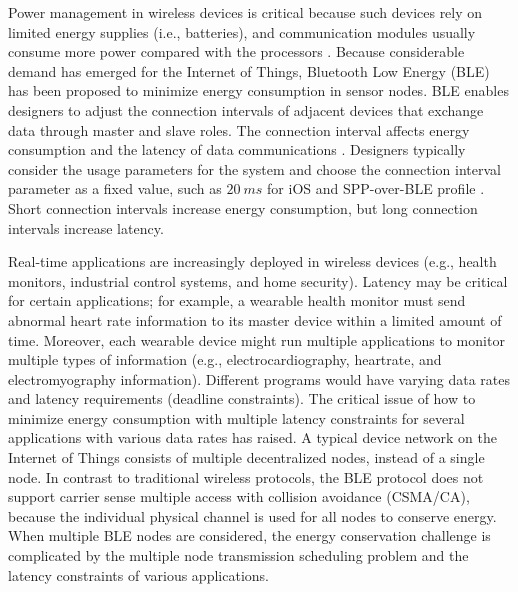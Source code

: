 \documentclass[10pt,journal,compsoc]{IEEEtran}
\begin{document}
Power management in wireless devices is critical because such devices rely on limited energy supplies (i.e., batteries), and communication modules usually consume more power compared with the processors \cite{phuong2015real}. Because considerable demand has emerged for the Internet of Things, Bluetooth Low Energy (BLE) has been proposed to minimize energy consumption in sensor nodes. BLE enables designers to adjust the connection intervals of adjacent devices that exchange data through master and slave roles. The connection interval affects energy consumption and the latency of data communications \cite{USG_CC2540}. Designers typically consider the usage parameters for the system and choose the connection interval parameter as a fixed value, such as $20~ms$ for iOS \cite{iOSdefault} and SPP-over-BLE profile \cite{BLE112}. Short connection intervals increase energy consumption, but long connection intervals increase latency.

Real-time applications are increasingly deployed in wireless devices (e.g., health monitors, industrial control systems, and home security). Latency may be critical for certain applications; for example, a wearable health monitor must send abnormal heart rate information to its master device within a limited amount of time. Moreover, each wearable device might run multiple applications to monitor multiple types of information (e.g., electrocardiography, heartrate, and electromyography information). Different programs would have varying data rates and latency requirements (deadline constraints). The critical issue of how to minimize energy consumption with multiple latency constraints for several applications with various data rates has raised. A typical device network on the Internet of Things consists of multiple decentralized nodes, instead of a single node. In contrast to traditional wireless protocols, the BLE protocol does not support carrier sense multiple access with collision avoidance (CSMA/CA), because the individual physical channel is used for all nodes to conserve energy. When multiple BLE nodes are considered, the energy conservation challenge is complicated by the multiple node transmission scheduling problem and the latency constraints of various applications.

\end{document}
